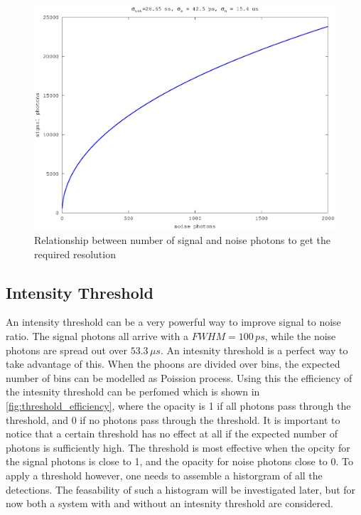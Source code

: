 \begin{figure}[h]
\centering
	\includegraphics[width=0.8\linewidth]{fig/altimetry_s_vs_n_small.eps}
\caption{Relationship between number of signal and noise photons to get the required resolution}
\label{fig:altimetry_s_vs_n_small}
\end{figure}

\subsection{Intensity Threshold}\label{sssec:energy_threshold}
An intensity threshold can be a very powerful way to improve signal to noise ratio. The signal photons all arrive with a $FWHM = 100\,ps$, while the noise photons are spread out over $53.3\,\mu s$. An intesnity threshold is a perfect way to take advantage of this. When the phoons are divided over bins, the expected number of bins can be modelled as Poission process. Using this the efficiency of the intesnity threshold can be perfomed which is shown in \cref{fig:threshold_efficiency}, where the opacity is 1 if all photons pass through the threshold, and 0 if no photons pass through the threshold. It is important to notice that a certain threshold has no effect at all if the expected number of photons is sufficiently high. The threshold is most effective when the opcity for the signal photons is close to 1, and the opacity for noise photons close to 0. To apply a threshold however, one needs to assemble a historgram of all the detections. The feasability of such a histogram will be investigated later, but for now both a system with and without an intesnity threshold are considered.  

